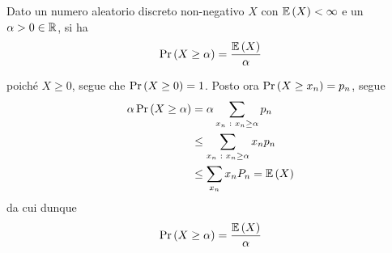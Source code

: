\documentclass{subfiles}
\begin{document}
\begin{Theorem}
    Dato un numero aleatorio discreto non-negativo \(X\) con \(\Expected{X} < \infty\) e un \(\alpha > 0 \in \operatorname{\mathbb{R}}\), si ha
    \[
        \Prob{X \ge \alpha} = \Frac{\Expected{X}}{\alpha}
    \]
    \begin{Proof*}
        poiché \(X \ge 0\), segue che \(\Prob{X \ge 0} = 1\). Posto ora \(\Prob{X \ge x_{n}} = p_{n}\), segue
        \[\begin{aligned}
                \alpha \Prob{X \ge \alpha} & = \alpha \Sum{p_{n}}{x_{n} \Such x_{n} \ge \alpha} \\
                                           & \le \Sum{x_{n}p_{n}}{x_{n} \Such x_{n} \ge \alpha} \\
                                           & \le \Sum{x_{n} P_{n}}{x_{n}} = \Expected{X}
            \end{aligned}\]
        da cui dunque
        \[
            \Prob{X \ge \alpha} = \Frac{\Expected{X}}{\alpha}
        \]
    \end{Proof*}
\end{Theorem}
\end{document}
